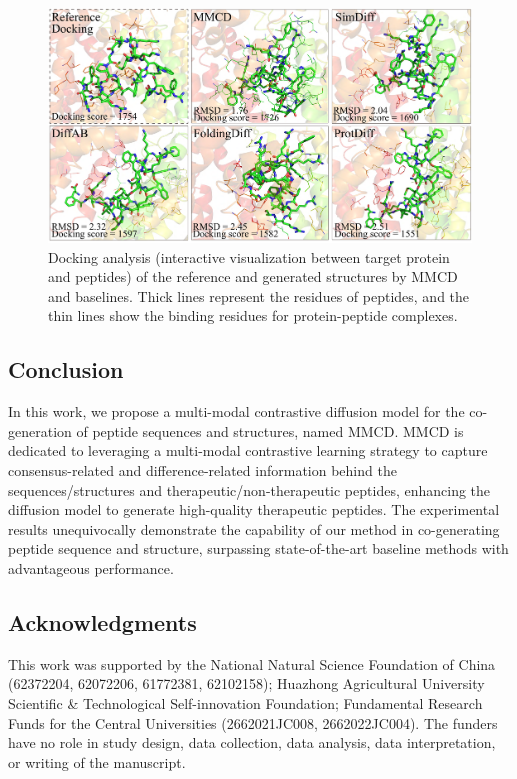 \documentclass[letterpaper]{article} %
\begin{document}
\begin{figure}[ht]
\includegraphics[scale=0.135]{fig4.pdf}
\caption{Docking analysis (interactive visualization between target protein and peptides) of the reference and generated structures by MMCD and baselines. Thick lines represent the residues of peptides, and the thin lines show the binding residues for protein-peptide complexes.}
\end{figure}

\subsection{Conclusion}
In this work, we propose a multi-modal contrastive diffusion model for the co-generation of peptide sequences and structures, named MMCD. MMCD is dedicated to leveraging a multi-modal contrastive learning strategy to capture consensus-related and difference-related information behind the sequences/structures and therapeutic/non-therapeutic peptides, enhancing the diffusion model to generate high-quality therapeutic peptides. The experimental results unequivocally demonstrate the capability of our method in co-generating peptide sequence and structure, surpassing state-of-the-art baseline methods with advantageous performance.

\subsection{Acknowledgments}
This work was supported by the National Natural Science Foundation of China (62372204, 62072206, 61772381, 62102158); Huazhong Agricultural University Scientific \& Technological Self-innovation Foundation; Fundamental Research Funds for the Central Universities (2662021JC008, 2662022JC004). The funders have no role in study design, data collection, data analysis, data interpretation, or writing of the manuscript.


\end{document}

